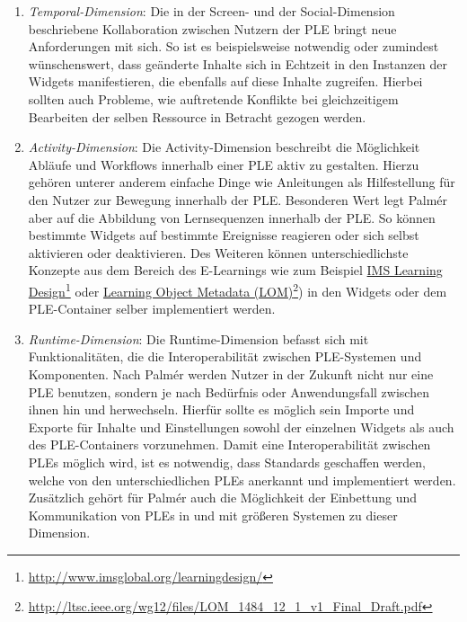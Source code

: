 \begin{enumerate}
 \item \emph{Temporal-Dimension}: Die in der Screen- und der Social-Dimension beschriebene Kollaboration zwischen Nutzern der PLE bringt neue Anforderungen mit sich. So ist es beispielsweise notwendig oder zumindest wünschenswert, dass geänderte Inhalte sich in Echtzeit in den Instanzen der Widgets manifestieren, die ebenfalls auf diese Inhalte zugreifen. Hierbei sollten auch Probleme, wie auftretende Konflikte bei gleichzeitigem Bearbeiten der selben Ressource in Betracht gezogen werden.
 \item \emph{Activity-Dimension}: Die Activity-Dimension beschreibt die Möglichkeit Abläufe und Workflows innerhalb einer PLE aktiv zu gestalten. Hierzu gehören unterer anderem einfache Dinge wie Anleitungen als Hilfestellung für den Nutzer zur Bewegung innerhalb der PLE. Besonderen Wert legt Palmér aber auf die Abbildung von Lernsequenzen innerhalb der PLE. So können bestimmte Widgets auf bestimmte Ereignisse reagieren oder sich selbst aktivieren oder deaktivieren. Des Weiteren können unterschiedlichste Konzepte aus dem Bereich des E-Learnings wie zum Beispiel \href{http://www.imsglobal.org/learningdesign/}{IMS Learning Design}\footnote{\url{http://www.imsglobal.org/learningdesign/}} oder \href{http://ltsc.ieee.org/wg12/files/LOM_1484_12_1_v1_Final_Draft.pdf}{Learning Object Metadata (LOM)}\footnote{\url{http://ltsc.ieee.org/wg12/files/LOM_1484_12_1_v1_Final_Draft.pdf}}) in den Widgets oder dem PLE-Container selber implementiert werden.
 \item \emph{Runtime-Dimension}: Die Runtime-Dimension befasst sich mit Funktionalitäten, die die Interoperabilität zwischen PLE-Systemen und Komponenten. Nach Palmér werden Nutzer in der Zukunft nicht nur eine PLE benutzen, sondern je nach Bedürfnis oder Anwendungsfall zwischen ihnen hin und herwechseln. Hierfür sollte es möglich sein Importe und Exporte für Inhalte und Einstellungen sowohl der einzelnen Widgets als auch des PLE-Containers vorzunehmen. Damit eine Interoperabilität
 zwischen PLEs möglich wird, ist es notwendig, dass Standards geschaffen werden, welche von den unterschiedlichen PLEs anerkannt und implementiert werden. Zusätzlich gehört für Palmér auch die Möglichkeit der Einbettung und Kommunikation von PLEs in und mit größeren Systemen zu dieser Dimension.
\end{enumerate}

